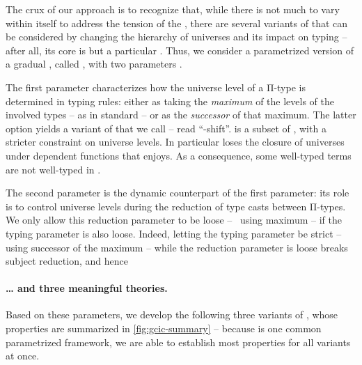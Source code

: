 The crux of our approach is to recognize that, while there is not much to vary within  itself to address the tension of the ,
there are several variants of  that can be considered by changing
the hierarchy of universes and its impact on typing –
after all, its core 
is but a particular  .
Thus, we consider a parametrized version of a gradual , called
, with two parameters%
.

\AP The first parameter characterizes how the universe level of a Π-type is determined
in typing rules: either as taking the \emph{maximum} of the levels of the involved 
types – as in standard  – or as the \emph{successor} of that maximum.
The latter option yields a variant of  that we call  – read “-shift”.
 is a subset of , with a stricter constraint on universe levels.
In particular  loses the closure of universes under
dependent functions that  enjoys.
As a consequence, some well-typed  terms are not well-typed in .%

The second parameter is the dynamic counterpart of the first parameter:
its role is to control universe levels during the reduction of type casts between Π-types.
We only allow this reduction parameter to be loose – \ie~using maximum –
if the typing parameter is also loose. Indeed, letting the typing parameter be strict 
– \ie using successor of the maximum – while the reduction parameter is loose
breaks subject reduction, and hence 

\paragraph{… and three meaningful theories.}

Based on these parameters, we develop the following three variants of ,
whose properties are summarized in \cref{fig:gcic-summary}
– because  is one common parametrized framework,
we are able to establish most properties for all variants at once.

